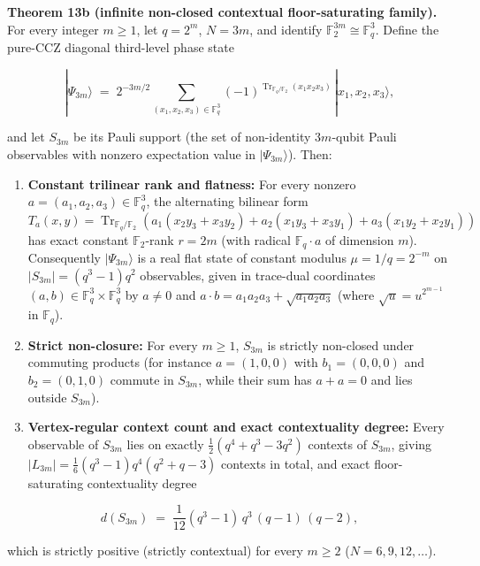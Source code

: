 \documentclass[11pt,a4paper]{article}
\providecommand{\tightlist}{\setlength{\itemsep}{0pt}\setlength{\parskip}{0pt}}
\begin{document}
\textbf{Theorem 13b (infinite non-closed contextual floor-saturating family).} For every integer \(m \ge 1\), let
\(q = 2^m\), \(N = 3m\), and identify \(\mathbb{F}_2^{3m} \cong \mathbb{F}_q^3\). Define the pure-CCZ diagonal
third-level phase state

\[|\Psi_{3m}\rangle \;=\; 2^{-3m/2} \sum_{(x_1, x_2, x_3) \in \mathbb{F}_q^3}
  (-1)^{\operatorname{Tr}_{\mathbb{F}_q/\mathbb{F}_2}(x_1 x_2 x_3)}\, |x_1, x_2, x_3\rangle ,\]

and let \(S_{3m}\) be its Pauli support (the set of non-identity \(3m\)-qubit Pauli observables with nonzero
expectation value in \(|\Psi_{3m}\rangle\)). Then:

\begin{enumerate}
\def\labelenumi{\arabic{enumi}.}
\tightlist
\item
  \textbf{Constant trilinear rank and flatness:} For every nonzero \(a = (a_1, a_2, a_3) \in \mathbb{F}_q^3\),
  the alternating bilinear form \(T_a(x, y) = \operatorname{Tr}_{\mathbb{F}_q/\mathbb{F}_2}(a_1(x_2 y_3 + x_3 y_2) + a_2(x_1 y_3 + x_3 y_1) + a_3(x_1 y_2 + x_2 y_1))\)
  has exact constant \(\mathbb{F}_2\)-rank \(r = 2m\) (with radical \(\mathbb{F}_q \cdot a\) of dimension \(m\)).
  Consequently \(|\Psi_{3m}\rangle\) is a real flat state of constant modulus \(\mu = 1/q = 2^{-m}\) on
  \(|S_{3m}| = (q^3 - 1)q^2\) observables, given in trace-dual coordinates \((a, b) \in \mathbb{F}_q^3 \times \mathbb{F}_q^3\)
  by \(a \ne 0\) and \(a \cdot b = a_1 a_2 a_3 + \sqrt{a_1 a_2 a_3}\) (where \(\sqrt{u} = u^{2^{m-1}}\) in
  \(\mathbb{F}_q\)).
\item
  \textbf{Strict non-closure:} For every \(m \ge 1\), \(S_{3m}\) is strictly non-closed under commuting products
  (for instance \(a = (1, 0, 0)\) with \(b_1 = (0, 0, 0)\) and \(b_2 = (0, 1, 0)\) commute in \(S_{3m}\), while
  their sum has \(a + a = 0\) and lies outside \(S_{3m}\)).
\item
  \textbf{Vertex-regular context count and exact contextuality degree:} Every observable of \(S_{3m}\) lies on
  exactly \(\tfrac12(q^4 + q^3 - 3q^2)\) contexts of \(S_{3m}\), giving
  \(|L_{3m}| = \tfrac16(q^3 - 1)q^4(q^2 + q - 3)\) contexts in total, and exact floor-saturating
  contextuality degree
\end{enumerate}

\[d(S_{3m}) \;=\; \frac{1}{12}(q^3 - 1)\,q^3\,(q - 1)\,(q - 2) ,\]

which is strictly positive (strictly contextual) for every \(m \ge 2\) (\(N = 6, 9, 12, \ldots\)).
\end{document}
